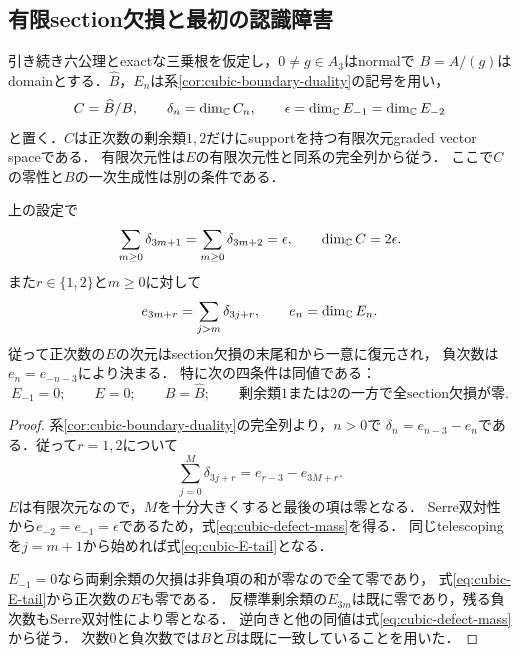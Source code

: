 \documentclass[11pt,a4paper]{ltjsarticle}
\begin{document}
\subsection{有限section欠損と最初の認識障害}

引き続き六公理とexactな三乗根を仮定し，$0\ne g\in A_3$はnormalで
$B=A/(g)$はdomainとする．$\widehat B$，$E_n$は系\ref{cor:cubic-boundary-duality}の記号を用い，
\[
 C=\widehat B/B,\qquad
 \delta_n=\dim_\mathbb C C_n,\qquad
 \epsilon=\dim_\mathbb C E_{-1}=\dim_\mathbb C E_{-2}
\]
と置く．$C$は正次数の剰余類$1,2$だけにsupportを持つ有限次元graded vector spaceである．
有限次元性は$E$の有限次元性と同系の完全列から従う．
ここで$C$の零性と$B$の一次生成性は別の条件である．

\begin{proposition}[Section欠損の質量とExtの復元]\label{prop:cubic-defect-mass}
上の設定で
\begin{equation}\label{eq:cubic-defect-mass}
 \sum_{m\geq0}\delta_{3m+1}
 =\sum_{m\geq0}\delta_{3m+2}
 =\epsilon,
 \qquad \dim_\mathbb C C=2\epsilon.
\end{equation}
また$r\in\{1,2\}$と$m\geq0$に対して
\begin{equation}\label{eq:cubic-E-tail}
 e_{3m+r}=\sum_{j>m}\delta_{3j+r},\qquad e_n=\dim_\mathbb C E_n.
\end{equation}
従って正次数の$E$の次元はsection欠損の末尾和から一意に復元され，
負次数は$e_n=e_{-n-3}$により決まる．
特に次の四条件は同値である：
\[
 E_{-1}=0;\qquad E=0;\qquad B=\widehat B;\qquad
 \text{剰余類$1$または$2$の一方で全section欠損が零}.
\]
\end{proposition}
\begin{proof}
系\ref{cor:cubic-boundary-duality}の完全列より，$n>0$で
$\delta_n=e_{n-3}-e_n$である．従って$r=1,2$について
\[
 \sum_{j=0}^{M}\delta_{3j+r}
 =e_{r-3}-e_{3M+r}.
\]
$E$は有限次元なので，$M$を十分大きくすると最後の項は零となる．
Serre双対性から$e_{-2}=e_{-1}=\epsilon$であるため，式\eqref{eq:cubic-defect-mass}を得る．
同じtelescopingを$j=m+1$から始めれば式\eqref{eq:cubic-E-tail}となる．

$E_{-1}=0$なら両剰余類の欠損は非負項の和が零なので全て零であり，
式\eqref{eq:cubic-E-tail}から正次数の$E$も零である．
反標準剰余類の$E_{3m}$は既に零であり，残る負次数もSerre双対性により零となる．
逆向きと他の同値は式\eqref{eq:cubic-defect-mass}から従う．
次数$0$と負次数では$B$と$\widehat B$は既に一致していることを用いた．
\end{proof}
\end{document}
